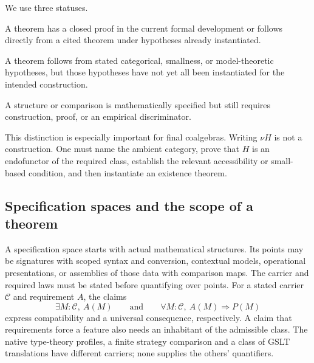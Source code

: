 \documentclass[11pt]{article}
\theoremstyle{definition}
\theoremstyle{remark}
\begin{document}
We use three statuses.

\begin{description}[leftmargin=2.7cm,style=nextline]
\item[Proved.] A theorem has a closed proof in the current formal development or
  follows directly from a cited theorem under hypotheses already instantiated.
\item[Conditional.] A theorem follows from stated categorical, smallness, or
  model-theoretic hypotheses, but those hypotheses have not yet all been
  instantiated for the intended construction.
\item[Design target.] A structure or comparison is mathematically specified but
  still requires construction, proof, or an empirical discriminator.
\end{description}

This distinction is especially important for final coalgebras.  Writing
$\nu H$ is not a construction.  One must name the ambient category, prove that
$H$ is an endofunctor of the required class, establish the relevant accessibility
or small-based condition, and then instantiate an existence theorem.

\subsection{Specification spaces and the scope of a theorem}
\label{sec:specification-space}

A specification space starts with actual mathematical structures. Its points
may be signatures with scoped syntax and conversion, contextual models,
operational presentations, or assemblies of those data with comparison maps.
The carrier and required laws must be stated before quantifying over points.
For a stated carrier $\mathcal C$ and requirement $A$, the claims
\[
  \exists M:\mathcal C,\ A(M)
  \qquad\text{and}\qquad
  \forall M:\mathcal C,\ A(M)\Rightarrow P(M)
\]
express compatibility and a universal consequence, respectively. A claim that
requirements force a feature also needs an inhabitant of the admissible class.
The native type-theory profiles, a finite strategy comparison and a class of
GSLT translations have different carriers; none supplies the others' quantifiers.
\end{document}
